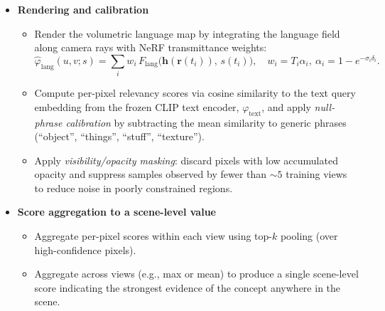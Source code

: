 \begin{enrichment}
\begin{enrichment}
        \begin{itemize}
            \item \textbf{Rendering and calibration}
            \begin{itemize}
                \item Render the volumetric language map by integrating the language field along camera rays with NeRF transmittance weights:
                \[
                \hat{\varphi}_{\text{lang}}(u,v;s)=\sum_i w_i\,F_{\text{lang}}\!\big(\mathbf{h}(\mathbf{r}(t_i)),\,s(t_i)\big),\quad
                w_i=T_i\alpha_i,\ \alpha_i=1-e^{-\sigma_i\delta_i}.
                \]
                \item Compute per-pixel relevancy scores via cosine similarity to the text query embedding from the frozen CLIP text encoder,
                \(\varphi_{\text{text}}\), and apply \emph{null-phrase calibration} by subtracting the mean similarity to generic phrases
                (``object'', ``things'', ``stuff'', ``texture'').
                \item Apply \emph{visibility/opacity masking}: discard pixels with low accumulated opacity and suppress samples observed by fewer than
                $\sim 5$ training views to reduce noise in poorly constrained regions.
            \end{itemize}
            
            \item \textbf{Score aggregation to a scene-level value}
            \begin{itemize}
                \item Aggregate per-pixel scores within each view using top-$k$ pooling (over high-confidence pixels).
                \item Aggregate across views (e.g., max or mean) to produce a single scene-level score indicating the strongest evidence of the concept anywhere in the scene.
            \end{itemize}
            

\end{itemize}
\end{enrichment}
\end{enrichment}
